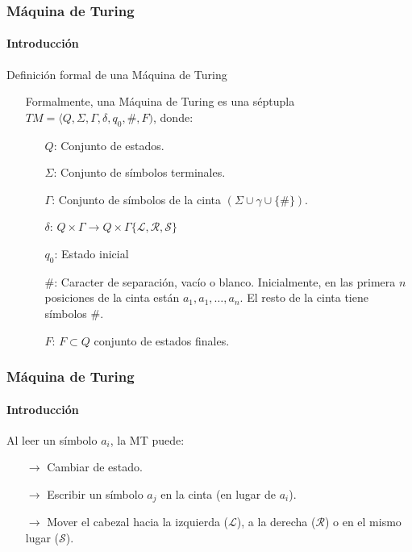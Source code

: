 \documentclass{beamer}
\begin{document}
        \begin{frame}
            \frametitle{M\'aquina de Turing}
            \framesubtitle{Introducci\'on}

			\begin{block}{Definici\'on formal de una M\'aquina de Turing}
			    \begin{itemize}
                    \item[] Formalmente, una M\'aquina de Turing es una s\'eptupla $TM = \langle Q, \Sigma, \Gamma, \delta, q_{0}, \#, F)$, donde:
                    \begin{itemize}
                        \item[] $Q$: Conjunto de estados.
                        \item[] $\Sigma$: Conjunto de s\'imbolos terminales.
                        \item[] $\Gamma$: Conjunto de s\'imbolos de la cinta $(\Sigma \cup \gamma \cup \{\#\})$.
                        \item[] $\delta$: $Q \times \Gamma \rightarrow Q \times \Gamma \{\mathcal{L}, \mathcal{R}, \mathcal{S}\}$
                        \item[] $q_{0}$: Estado inicial
                        \item[] $\#$: Caracter de separaci\'on, vac\'io o blanco. Inicialmente, en las primera $n$ posiciones de la cinta est\'an $a_{1},a_{1},\ldots,a_{n}$. El resto de la cinta tiene s\'imbolos \#.
                        \item[] $F$: $F \subset Q$ conjunto de estados finales.
                    \end{itemize}
                \end{itemize}
			\end{block}
		\end{frame}

        \begin{frame}
            \frametitle{M\'aquina de Turing}
            \framesubtitle{Introducci\'on}

			\begin{block}{Al leer un s\'imbolo $a_{i}$, la MT puede:}
			    \begin{itemize}
                    \item[$\rightarrow$] Cambiar de estado.
                    \item[$\rightarrow$] Escribir un s\'imbolo $a_{j}$ en la cinta (en lugar de $a_{i}$).
                    \item[$\rightarrow$] Mover el cabezal hacia la izquierda ($\mathcal{L}$), a la derecha ($\mathcal{R}$) o en el mismo lugar ($\mathcal{S}$).
                \end{itemize}
			\end{block}
		\end{frame}
\end{document}
